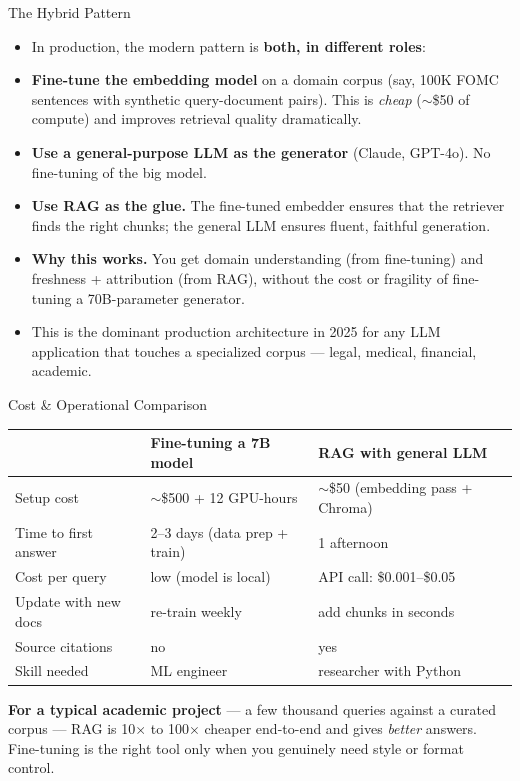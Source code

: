 \begin{frame}{The Hybrid Pattern}
\begin{itemize}
\item In production, the modern pattern is \textbf{both, in different roles}:

\medskip
\item \textbf{Fine-tune the embedding model} on a domain corpus (say, 100K FOMC sentences with synthetic query-document pairs). This is \emph{cheap} ($\sim$\$50 of compute) and improves retrieval quality dramatically.

\medskip
\item \textbf{Use a general-purpose LLM as the generator} (Claude, GPT-4o). No fine-tuning of the big model.

\medskip
\item \textbf{Use RAG as the glue.} The fine-tuned embedder ensures that the retriever finds the right chunks; the general LLM ensures fluent, faithful generation.

\medskip
\item \textbf{Why this works.} You get domain understanding (from fine-tuning) and freshness + attribution (from RAG), without the cost or fragility of fine-tuning a 70B-parameter generator.

\medskip
\item This is the dominant production architecture in 2025 for any LLM application that touches a specialized corpus --- legal, medical, financial, academic.
\end{itemize}
\end{frame}

\begin{frame}{Cost \& Operational Comparison}
\begin{center}
\renewcommand{\arraystretch}{1.35}
\small
\begin{tabular}{|p{4.0cm}|p{4.2cm}|p{4.5cm}|}
\hline
& \textbf{Fine-tuning a 7B model} & \textbf{RAG with general LLM} \\
\hline
Setup cost & $\sim$\$500 + 12 GPU-hours & $\sim$\$50 (embedding pass + Chroma) \\
\hline
Time to first answer & 2--3 days (data prep + train) & 1 afternoon \\
\hline
Cost per query & low (model is local) & API call: \$0.001--\$0.05 \\
\hline
Update with new docs & re-train weekly & add chunks in seconds \\
\hline
Source citations & no & yes \\
\hline
Skill needed & ML engineer & researcher with Python \\
\hline
\end{tabular}
\end{center}

\bigskip
\textbf{For a typical academic project} --- a few thousand queries against a curated corpus --- RAG is 10$\times$ to 100$\times$ cheaper end-to-end and gives \emph{better} answers. Fine-tuning is the right tool only when you genuinely need style or format control.
\end{frame}

